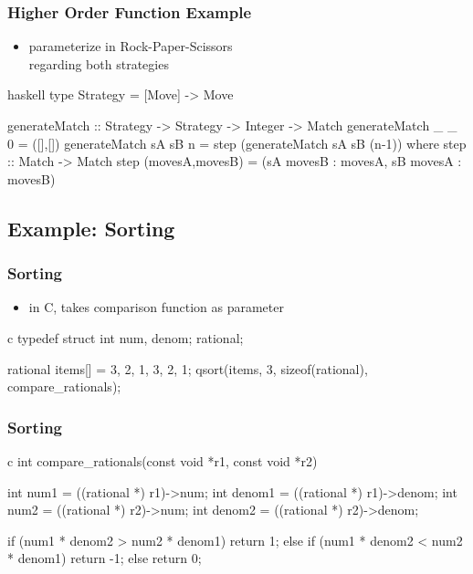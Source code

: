 \documentclass[dvipsnames]{beamer}
\theoremstyle{plain}
\begin{document}
\begin{frame}[fragile]
  \frametitle{Higher Order Function Example}

  \begin{itemize}
    \item parameterize  in Rock-Paper-Scissors\\
      regarding both strategies
  \end{itemize}

  \begin{exampleblock}{}
    \begin{pygments}{haskell}
type Strategy = [Move] -> Move

generateMatch :: Strategy -> Strategy -> Integer
                 -> Match
generateMatch _  _  0 = ([],[])
generateMatch sA sB n =
    step (generateMatch sA sB (n-1))
      where
        step :: Match -> Match
        step (movesA,movesB) = (sA movesB : movesA,
                                sB movesA : movesB)
    \end{pygments}
  \end{exampleblock}
\end{frame}

\subsection{Example: Sorting}

\begin{frame}[fragile]
  \frametitle{Sorting}

  \begin{itemize}
    \item in C,  takes comparison function as parameter
  \end{itemize}

  \begin{exampleblock}{}
    \begin{pygments}{c}
typedef struct {
    int num, denom;
} rational;

rational items[] = {{3, 2}, {1, 3}, {2, 1}};
qsort(items, 3, sizeof(rational), compare_rationals);
    \end{pygments}
  \end{exampleblock}
\end{frame}

\begin{frame}[fragile]
  \frametitle{Sorting}

  \begin{exampleblock}{}
    \begin{pygments}{c}
int compare_rationals(const void *r1, const void *r2)
{
    int num1 = ((rational *) r1)->num;
    int denom1 = ((rational *) r1)->denom;
    int num2 = ((rational *) r2)->num;
    int denom2 = ((rational *) r2)->denom;

    if (num1 * denom2 > num2 * denom1)
        return 1;
    else if (num1 * denom2 < num2 * denom1)
        return -1;
    else
        return 0;
}
    \end{pygments}
  \end{exampleblock}
\end{frame}
\end{document}
